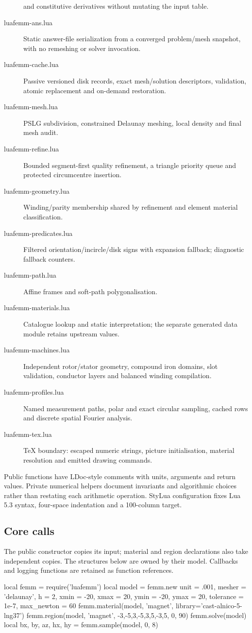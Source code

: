 \begin{description}
  and constitutive derivatives without mutating the input table.
\item[luafemm-ans.lua] Static answer-file serialization from a converged
  problem/mesh snapshot, with no remeshing or solver invocation.
\item[luafemm-cache.lua] Passive versioned disk records, exact mesh/solution
  descriptors, validation, atomic replacement and on-demand restoration.
\item[luafemm-mesh.lua] PSLG subdivision, constrained Delaunay meshing,
  local density and final mesh audit.
\item[luafemm-refine.lua] Bounded segment-first quality refinement, a triangle
  priority queue and protected circumcentre insertion.
\item[luafemm-geometry.lua] Winding/parity membership shared by refinement
  and element material classification.
\item[luafemm-predicates.lua] Filtered orientation/incircle/disk signs with
  expansion fallback; diagnostic fallback counters.
\item[luafemm-path.lua] Affine frames and soft-path polygonalisation.
\item[luafemm-materials.lua] Catalogue lookup and static interpretation;
  the separate generated data module retains upstream values.
\item[luafemm-machines.lua] Independent rotor/stator geometry, compound iron
  domains, slot validation, conductor layers and balanced winding compilation.
\item[luafemm-profiles.lua] Named measurement paths, polar and exact circular
  sampling, cached rows and discrete spatial Fourier analysis.
\item[luafemm-tex.lua] TeX boundary: escaped numeric strings, picture
  initialisation, material resolution and emitted drawing commands.
\end{description}
Public functions have LDoc-style comments with units, arguments and
return values. Private numerical helpers document invariants and algorithmic
choices rather than restating each arithmetic operation. StyLua configuration
fixes Lua 5.3 syntax, four-space indentation and a 100-column target.

\subsection{Core calls}
The public constructor copies its input; material and region declarations
also take independent copies. The structures below are owned by their model.
Callbacks and logging functions are retained as function references.
\begin{codeexample}
local femm = require('luafemm')
local model = femm.new {
  unit = .001, mesher = 'delaunay', h = 2,
  xmin = -20, xmax = 20, ymin = -20, ymax = 20,
  tolerance = 1e-7, max_newton = 60
}
femm.material(model, 'magnet', {library='cast-alnico-5-lng37'})
femm.region(model, 'magnet', {{-3,-5},{3,-5},{3,5},{-3,5}}, 0, 90)
femm.solve(model)
local bx, by, az, hx, hy = femm.sample(model, 0, 8)
\end{codeexample}

